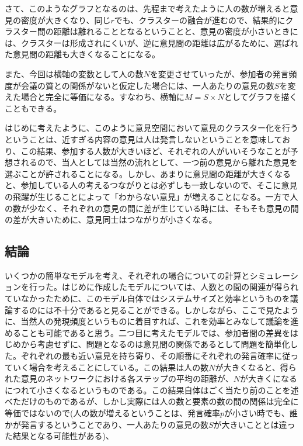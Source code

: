 \documentclass[letterpaper,10pt,english]{sphinxmanual}
\begin{document}
さて、このようなグラフとなるのは、先程まで考えたように人の数が増えると意見の密度が大きくなり、同じ\(r\)でも、クラスターの融合が進むので、結果的にクラスター間の距離は離れることとなるということと、意見の密度が小さいときには、クラスターは形成されにくいが、逆に意見間の距離は広がるために、選ばれた意見間の距離も大きくなることになる。

また、今回は横軸の変数として人の数\(N\)を変更させていったが、参加者の発言頻度が会議の質との関係がないと仮定した場合には、一人あたりの意見の数\(S\)を変えた場合と完全に等価になる。すなわち、横軸に\(M=S\times N\)としてグラフを描くこともできる。

はじめに考えたように、このように意見空間において意見のクラスター化を行うということは、近すぎる内容の意見は人は発言しないということを意味しており、この結果、参加する人数が大きいほど、それぞれの人がいいそうなことが予想されるので、当人としては当然の流れとして、一つ前の意見から離れた意見を選ぶことが許されることになる。しかし、あまりに意見間の距離が大きくなると、参加している人の考えるつながりとは必ずしも一致しないので、そこに意見の飛躍が生じることによって「わからない意見」が増えることになる。一方で人の数が少なく、それぞれの意見の間に差が生じている時には、そもそも意見の間の差が大きいために、意見同士はつながりが小さくなる。


\subsection{結論}
\label{draft:id10}
いくつかの簡単なモデルを考え、それぞれの場合についての計算とシミュレーションを行った。はじめに作成したモデルについては、人数との間の関連が得られていなかったために、このモデル自体ではシステムサイズと効率というものを議論するのには不十分であると見ることができる。しかしながら、ここで見たように、当然人の発現頻度というものに着目すれば、これを効率とみなして議論を進めることも可能であると思う。二つ目に考えたモデルでは、参加者間の差異をはじめから考慮せずに、問題となるのは意見間の関係であるとして問題を簡単化した。ぞれぞれの最も近い意見を持ち寄り、その順番にそれぞれの発言確率に従っていく場合を考えることにしている。この結果は人の数\(N\)が大きくなると、得られた意見のネットワークにおける各ステップの平均の距離が、\(N\)が大きくになるにつれて小さくなるというものである。この結果自体はごく当たり前のことを述べただけのものであるが、しかし実際には人の数と要素の数の間の関係は完全に等価ではないので(人の数が増えるということは、発言確率\(p\)が小さい時でも、誰かが発言するということであり、一人あたりの意見の数\(S\)が大きいこととは違った結果となる可能性がある)、



\renewcommand{\indexname}{Index}
\printindex
\end{document}
